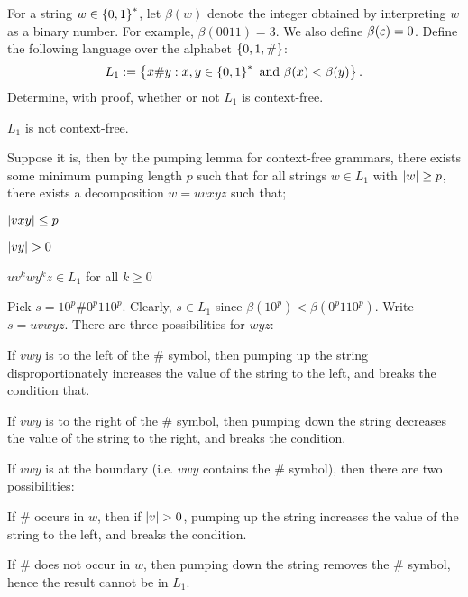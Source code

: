 \begin{problem}
  For a string $w \in \left\{0, 1\right\}^*$, let $\beta(w)$ denote the integer
  obtained by interpreting $w$ as a binary number.  For example,
  $\beta(0011) = 3$. We also define $\beta(\varepsilon) = 0$.
  Define the following language over the alphabet $\left\{0, 1, \#\right\}$:
  \[ L_1 := \left\{x\#y : x, y \in \left\{0, 1\right\}^* \text{ and } \beta(x) < \beta(y)\right\}. \]
  Determine, with proof, whether or not $L_1$ is context-free.
\end{problem}
\begin{Answer}
  $L_1$ is not context-free.

  \step
  Suppose it is, then by the pumping lemma for context-free grammars,
  there exists some minimum pumping length $p$ such that for all strings
  $w \in L_1$ with $\lvert w\rvert \geq p$, there exists a decomposition
  $w = uvxyz$ such that;
  \begin{enumroman}
    \item $\lvert vxy\rvert \leq p$
    \item $\lvert vy\rvert > 0$
    \item $uv^kwy^kz \in L_1$ for all $k \geq 0$
  \end{enumroman}

  \step
  Pick $s = 10^p\#0^p110^p$. Clearly, $s \in L_1$ since $\beta(10^p) < \beta(0^p110^p)$.
  Write $s = uvwyz$. There are three possibilities for $wyz$:
  \begin{enumroman}
    \item If $vwy$ is to the left of the $\#$ symbol, then pumping up the string
      disproportionately increases the value of the string to the left, and breaks
      the condition that.
    \item If $vwy$ is to the right of the $\#$ symbol, then pumping down the string
      decreases the value of the string to the right, and breaks the condition.
    \item If $vwy$ is at the boundary (i.e. $vwy$ contains the $\#$ symbol), then there
      are two possibilities:
      \begin{enumroman}
        \item If $\#$ occurs in $w$, then if $\lvert v\rvert > 0$, pumping up the string
          increases the value of the string to the left, and breaks the condition.
        
        \item If $\#$ does not occur in $w$, then pumping down the string removes the
          $\#$ symbol, hence the result cannot be in $L_1$.
      \end{enumroman}
  \end{enumroman}


\end{Answer}
